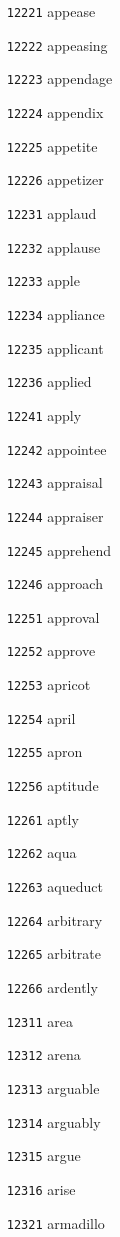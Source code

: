 \documentclass[twoside,11pt]{article}
\begin{document}
\begin{multicols}{5}
\begin{enumerate}
\item[\texttt{12221}] appease
\item[\texttt{12222}] appeasing
\item[\texttt{12223}] appendage
\item[\texttt{12224}] appendix
\item[\texttt{12225}] appetite
\item[\texttt{12226}] appetizer
\item[\texttt{12231}] applaud
\item[\texttt{12232}] applause
\item[\texttt{12233}] apple
\item[\texttt{12234}] appliance
\item[\texttt{12235}] applicant
\item[\texttt{12236}] applied
\item[\texttt{12241}] apply
\item[\texttt{12242}] appointee
\item[\texttt{12243}] appraisal
\item[\texttt{12244}] appraiser
\item[\texttt{12245}] apprehend
\item[\texttt{12246}] approach
\item[\texttt{12251}] approval
\item[\texttt{12252}] approve
\item[\texttt{12253}] apricot
\item[\texttt{12254}] april
\item[\texttt{12255}] apron
\item[\texttt{12256}] aptitude
\item[\texttt{12261}] aptly
\item[\texttt{12262}] aqua
\item[\texttt{12263}] aqueduct
\item[\texttt{12264}] arbitrary
\item[\texttt{12265}] arbitrate
\item[\texttt{12266}] ardently
\item[\texttt{12311}] area
\item[\texttt{12312}] arena
\item[\texttt{12313}] arguable
\item[\texttt{12314}] arguably
\item[\texttt{12315}] argue
\item[\texttt{12316}] arise
\item[\texttt{12321}] armadillo

\end{enumerate}
\end{multicols}
\end{document}
